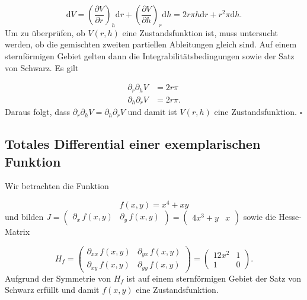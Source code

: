       \begin{equation}
        \text{d}V = \left(\frac{\partial V}{\partial r}\right)_{h} \text{d}r + \left(\frac{\partial V}{\partial h}\right)_{r} \text{d} h = 2r\pi h \text{d}r + r^2 \pi \text{d} h. \label{eq:totalesDifferentialAllgemein} 
      \end{equation}
    Um zu überprüfen, ob $V(r,h)$ eine Zustandsfunktion ist, muss untersucht werden, ob die gemischten zweiten partiellen Ableitungen gleich sind. Auf einem sternförmigen Gebiet gelten dann die Integrabilitätsbedingungen sowie der Satz von Schwarz. Es gilt 
    
      \begin{equation}
        \begin{split}
          \partial_{r}\partial_{h} V &= 2 r\pi  \\
          \partial_{h}\partial_{r} V &= 2 r\pi. \label{eq:ZeiteAbleitungVolumen}
        \end{split}
      \end{equation}
    Daraus folgt, dass $\partial_{r}\partial_{h} V = \partial_{h}\partial_{r} V$ und damit ist $V(r,h)$ eine Zustandsfunktion. $\square$

  \pagebreak
  
  \subsection{Totales Differential einer exemplarischen Funktion}
  
    Wir betrachten die Funktion
    
      \begin{equation}
        f(x,y) = x^4 + xy
      \end{equation}
    und bilden $J = \begin{pmatrix} \partial_{x} \, f(x,y) & \partial_y \, f(x,y)\end{pmatrix} = \begin{pmatrix} 4x^3 + y & x \end{pmatrix}$
    sowie die Hesse-Matrix 
    
      \begin{equation} 
        H_f = \begin{pmatrix} \partial_{xx} \, f(x,y) & \partial_{yx} \, f(x,y)\\ \partial_{xy} \, f(x,y)& \partial_{yy} \, f(x,y) \end{pmatrix} = \begin{pmatrix} 12x^2& 1\\ 1& 0 \end{pmatrix}.
      \end{equation}
    Aufgrund der Symmetrie von $H_f$ ist auf einem sternförmigen Gebiet der Satz von Schwarz erfüllt und damit $f(x,y)$ eine Zustandsfunktion.
    
